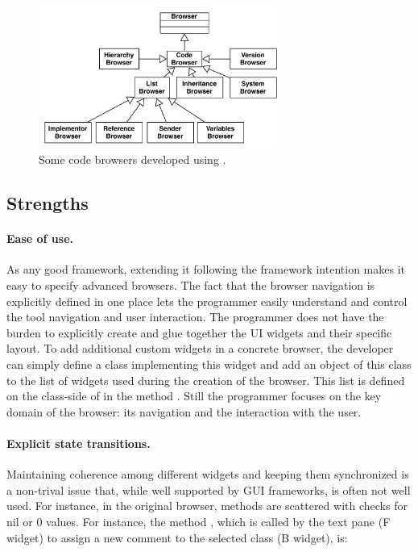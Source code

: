\documentclass[a4paper,10pt,twoside]{book}
\begin{document}


\begin{figure}
\begin{center}
\includegraphics[width=8cm]{BrowserFamily}
\caption{Some code browsers developed using \obf.}\label{browsers}
\end{center}
\end{figure}


\subsection{Strengths}

\paragraph{Ease of use.}
As any good framework, extending it following the framework intention makes it easy to specify advanced browsers. The fact that the browser navigation is explicitly defined in one place lets the programmer easily understand and control the tool navigation and user interaction. The programmer does not have the burden to explicitly create and glue together the UI widgets and their specific layout. To add additional custom widgets in a concrete browser, the developer can simply define a class implementing this widget and add an object of this class to the list of widgets used during the creation of the browser. This list is defined on the class-side of  in the method . Still the programmer focuses on the key domain of the browser: its navigation and the interaction with the user. 

\paragraph{Explicit state transitions.} Maintaining coherence among different widgets and keeping them synchronized is a non-trival issue that, while well supported by GUI frameworks,  is often not well used. For instance, in the original \pharo browser, methods are scattered with checks for nil or 0 values. For instance, the method , which is called by the text pane (F widget) to assign a new comment to the selected class (B widget), is:
\end{document}
